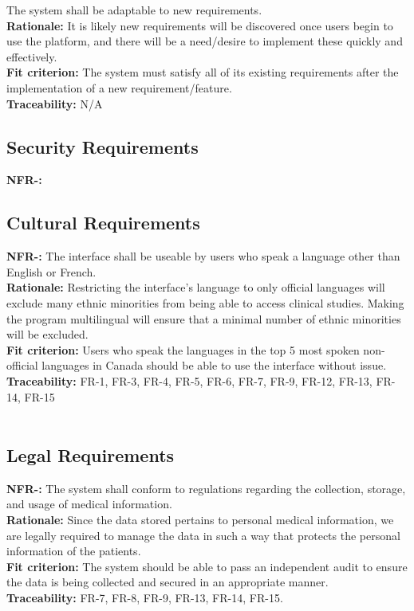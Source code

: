 \documentclass[12pt, titlepage]{article}
\newcounter{NFR_Counter}
\newcounter{FR_Counter}
\begin{document}
The system shall be adaptable to new requirements.\\
\textbf{Rationale:}
It is likely new requirements will be discovered once users begin to use the platform, and there will be a need/desire to 
implement these quickly and effectively.\\
\textbf{Fit criterion:}
The system must satisfy all of its existing requirements after the implementation of a new requirement/feature.\\
\textbf{Traceability:}
N/A
\addtocounter{NFR_Counter}{1}


\subsection{Security Requirements}
\noindent\textbf{NFR-\the\value{NFR_Counter}:}

\addtocounter{NFR_Counter}{1}

\subsection{Cultural Requirements}
\noindent\textbf{NFR-\the\value{NFR_Counter}:}
The interface shall be useable by users who speak a language other than English or French.  \\
\textbf{Rationale:}
Restricting the interface's language to only official languages will exclude many ethnic minorities from being able to access clinical studies. Making the program multilingual will ensure that a minimal number of ethnic minorities will be excluded. \\
\textbf{Fit criterion:}
Users who speak the languages in the top 5 most spoken non-official languages in Canada should be able to use the interface without issue. \\
\textbf{Traceability:}
FR-1, FR-3, FR-4, FR-5, FR-6, FR-7, FR-9, FR-12, FR-13, FR-14, FR-15 \\~\\
\addtocounter{NFR_Counter}{1}

\subsection{Legal Requirements}
\noindent\textbf{NFR-\the\value{NFR_Counter}:}
The system shall conform to regulations regarding the collection, storage, and usage of medical information.  \\
\textbf{Rationale:}
Since the data stored pertains to personal medical information, we are legally required to manage the data in such a way that protects the personal information of the patients. \\
\textbf{Fit criterion:}
The system should be able to pass an independent audit to ensure the data is being collected and secured in an appropriate manner. \\
\textbf{Traceability:}
FR-7, FR-8, FR-9, FR-13, FR-14, FR-15. \\~\\
\addtocounter{NFR_Counter}{1}
\end{document}
